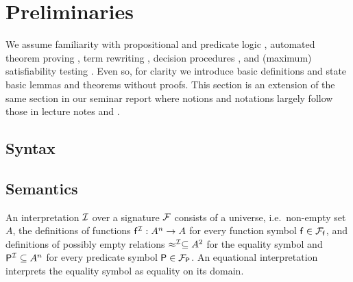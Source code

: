 
\chapter{Preliminaries}



We assume familiarity with propositional and predicate logic \cite{Huth:2004:LCS:975331}, 
automated theorem proving \cite{Fitting:1996:FLA:230183}, 
term rewriting \cite{Baader:1998:TR:280474}, 
decision procedures \cite{Kroening:2008:DPA:1391237}, 
and (maximum) satisfiability testing \cite{Biere:2009:HSV:1550723}.
Even so, for clarity we introduce basic
definitions and state basic lemmas and theorems without proofs.
This section is an extension of the same section in our seminar report \cite{axm:SR2}
where notions and notations largely follow those in lecture notes \cite{AM2015tr} and \cite{GM2013ar}.


\section{Syntax}
















\section{Semantics}

\begin{definition}
	An {\myem interpretation} ${\mathcal I}$ over a signature ${\mathcal F}$ consists 
	of a {\myem universe}, i.e.~non-empty set  $A$,
	the definitions of functions ${\mathsf f}^{\mathcal I}: A^n\rightarrow A$  for every function symbol ${\mathsf f}\in{{\mathcal F}_{\mathsf f}}$, 
	and definitions of possibly empty relations $\approx^{\mathcal I}\subseteq A^2$ for the equality symbol 
	and ${{\mathsf P}^{\mathcal I}}\subseteq A^n$ for every predicate symbol ${\mathsf P}\in{{\mathcal F}_{\mathsf P}}$.
%	
	An {\myem equational} interpretation interprets the equality symbol as equality on its domain.
\end{definition}


